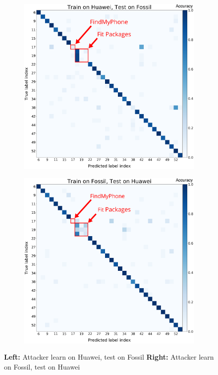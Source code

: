 \begin{figure}[h]
\centering
\begin{subfigure}{.5\textwidth}
  \centering
  \includegraphics[width=1\textwidth]{figures/cm/Confusion_matrix_train_with_Huawei_test_with_Fossil_annoted.png}
\end{subfigure}%
\begin{subfigure}{.5\textwidth}
  \centering
  \includegraphics[width=1\textwidth]{figures/cm/Confusion_matrix_train_with_Fossil_test_with_Huawei_annoted.png}
\end{subfigure}
\caption{\textbf{Left:} Attacker learn on Huawei, test on Fossil \textbf{Right:} Attacker learn on Fossil, test on Huawei}
\label{fig:cm transferability}
\end{figure}
